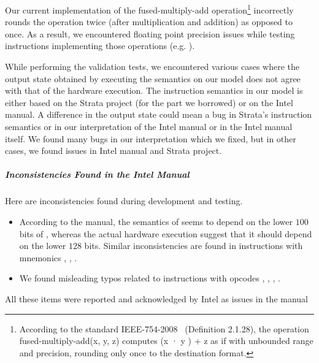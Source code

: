 Our current implementation of the fused-multiply-add operation\footnote{According to the standard IEEE-754-2008~\cite{FP} (Definition 2.1.28), the operation fused-multiply-add(x, y, z) computes (x · y ) + z as if with unbounded range and precision, rounding only once to the destination format.} incorrectly rounds the operation twice (after multiplication and addition) as opposed to once. As a result, we encountered floating point precision issues while testing instructions implementing those operations (e.g. ).  
 
While performing the validation tests, we encountered various cases where the output state obtained by executing the semantics on our model does not agree with that of the hardware execution. 
The instruction semantics in our model is either based on the Strata project (for the part we borrowed) or on the Intel manual. A difference in the output state could mean a bug in Strata's instruction semantics or in our interpretation of the Intel manual or in the Intel manual itself. We found many bugs in our interpretation which we fixed, but in other cases, we found issues  in Intel manual and Strata project.

\subparagraph{Inconsistencies Found in the Intel Manual} Here are inconsistencies found during development and testing.  
\begin{itemize}
    \item According to the manual, the semantics of   seems to depend on the lower $100$ bits of , whereas the actual hardware execution suggest that it should depend on the lower $128$ bits. Similar inconsistencies are found in instructions with mnemonics , , .
    
    \item We found misleading typos related to instructions with opcodes , , , .    
\end{itemize}
All these items were reported and acknowledged by Intel as issues in the manual~\cite{Suppl}
 
